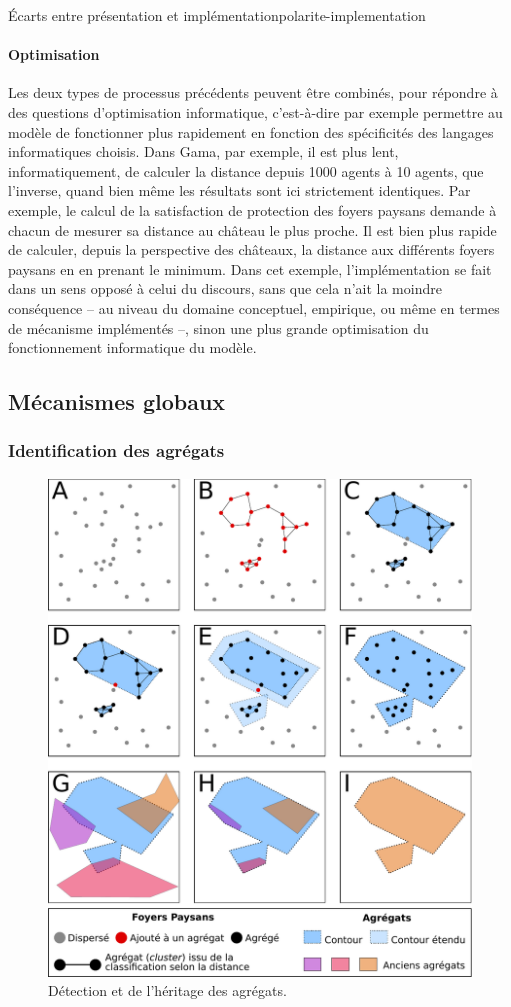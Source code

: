 \begin{encadre}{Écarts entre présentation et implémentation}{polarite-implementation}
\paragraph{Optimisation} Les deux types de processus précédents peuvent être combinés, pour répondre à des questions d'optimisation informatique, c'est-à-dire par exemple permettre au modèle de fonctionner plus rapidement en fonction des spécificités des langages informatiques choisis.
Dans Gama, par exemple, il est plus lent, informatiquement, de calculer la distance depuis 1000 agents à 10 agents, que l'inverse, quand bien même les résultats sont ici strictement identiques.
Par exemple, le calcul de la satisfaction de protection des foyers paysans demande à chacun de mesurer sa distance au château le plus proche.
Il est bien plus rapide de calculer, depuis la perspective des châteaux, la distance aux différents foyers paysans en en prenant le minimum.
Dans cet exemple, l'implémentation se fait dans un sens opposé à celui du discours, sans que cela n'ait la moindre conséquence -- au niveau du domaine conceptuel, empirique, ou même en termes de mécanisme implémentés --, sinon une plus grande optimisation du fonctionnement informatique du modèle.
\end{encadre}

\subsection{Mécanismes globaux}

\subsubsection{Identification des agrégats \label{sssec:agregats}}
	
\begin{figure}[H]
	\centering
	\includegraphics[width=.75\linewidth]{img/detection_agregats.pdf}
	\caption{Détection et de l'héritage des agrégats.}
	\label{fig:detection-agregats}
\end{figure}

